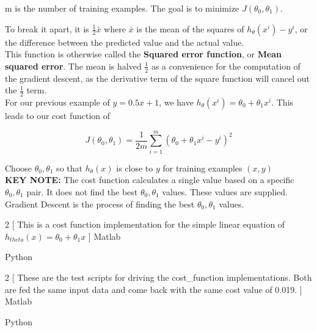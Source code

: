 m is the number of training examples. The goal is to minimize $J(\theta_{0}, \theta_{1})$.

To break it apart, it is $\frac{1}{2} \bar{x}$ where $\bar{x}$ is the mean of the squares of $h_{\theta}(x^{i}) -y^{i}$, or the difference between the predicted value and the actual value.\\

This function is otherwise called the \textbf{Squared error function}, or \textbf{Mean squared error}. The mean is halved $\frac{1}{2}$ as a convenience for the computation of the gradient descent, as the derivative term of the square function will cancel out the $\frac{1}{2}$ term. \\

For our previous example of $y=0.5x + 1$, we have $h_{\theta}(x^{i}) = \theta_{0} + \theta_{1}x^{i}$.  This leads to our cost function of 

\begin{equation}
J(\theta_{0}, \theta_{1}) = \frac{1}{2m} \sum_{i=1}^{m} (\theta_{0} + \theta_{1}x^{i} - y^{i})^{2} 
\end{equation}

Choose $\theta_{0}, \theta_{1}$ so that $h_{\theta}(x)$ is close to $y$ for training examples $(x,y)$\\

\textbf{KEY NOTE:} The cost function calculates a single value based on a specific $\theta_{0}, \theta_{1}$ pair.  It does not find the best $\theta_{0}, \theta_{1}$ values.  These values are supplied.  Gradient Descent is the process of finding the best $\theta_{0}, \theta_{1}$ values.

\newpage
\begin{multicols}{2}
  [
    This is a cost function implementation for the simple linear equation of $h_{theta}(x) = \theta_{0} + \theta_{1}x$
  ]
  Matlab\\
  \columnbreak

  Python\\
  
\end{multicols}

\newpage
\begin{multicols}{2}
  [
    These are the test scripts for driving the cost\_function implementations.  Both are fed the same input data and come back with the same cost value of 0.019.
  ]
  Matlab\\
  \columnbreak

  Python\\
  
\end{multicols}

